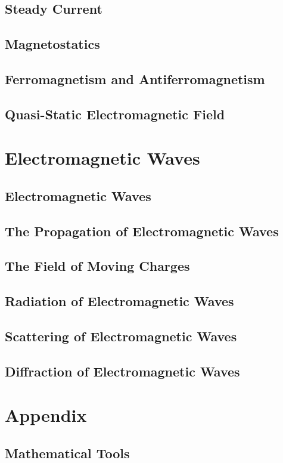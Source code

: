 \documentclass[
    ebook,
    11pt,
    oneside,
    onecolumn,
    openright,
    final
]{memoir}
\numberwithin{equation}{section}
\begin{document}
\chapter{Steady Current}

\chapter{Magnetostatics}

\chapter{Ferromagnetism and Antiferromagnetism}

\chapter{Quasi-Static Electromagnetic Field}

\part{Electromagnetic Waves}

\chapter{Electromagnetic Waves}

\chapter{The Propagation of Electromagnetic Waves}

\chapter{The Field of Moving Charges}

\chapter{Radiation of Electromagnetic Waves}

\chapter{Scattering of Electromagnetic Waves}

\chapter{Diffraction of Electromagnetic Waves}

\appendix
\part{Appendix}

\chapter{Mathematical Tools}

\backmatter
\end{document}

